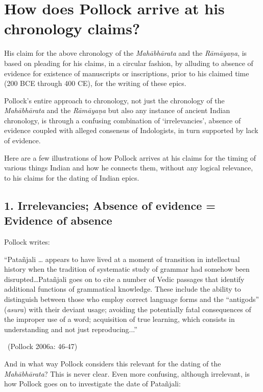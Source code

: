 \section*{How does Pollock arrive at his chronology claims?}

His claim for the above chronology of the \textit{Mahābhārata} and the \textit{Rāmāyaṇa}, is based on pleading for his claims, in a circular fashion, by alluding to absence of evidence for existence of manuscripts or inscriptions, prior to his claimed time (200 BCE through 400 CE), for the writing of these epics.

Pollock’s entire approach to chronology, not just the chronology of the \textit{Mahābhārata} and the \textit{Rāmāyaṇa} but also any instance of ancient Indian chronology, is through a confusing combination of ‘irrelevancies’, absence of evidence coupled with alleged consensus of Indologists, in turn supported by lack of evidence.

Here are a few illustrations of how Pollock arrives at his claims for the timing of various things Indian and how he connects them, without any logical relevance, to his claims for the dating of Indian epics.

\subsection*{1. Irrelevancies; Absence of evidence = Evidence of absence}

Pollock writes:

\begin{myquote}
“Patañjali … appears to have lived at a moment of transition in intellectual history when the tradition of systematic study of grammar had somehow been disrupted…Patañjali goes on to cite a number of Vedic passages that identify additional functions of grammatical knowledge. These include the ability to distinguish between those who employ correct language forms and the “antigods” (\textit{asura}) with their deviant usage; avoiding the potentially fatal consequences of the improper use of a word; acquisition of true learning, which consists in understanding and not just reproducing...” 

~\hfill (Pollock 2006a: 46-47)
\end{myquote}

And in what way Pollock considers this relevant for the dating of the \textit{Mahābhārata}? This is never clear. Even more confusing, although irrelevant, is how Pollock goes on to investigate the date of Patañjali:

